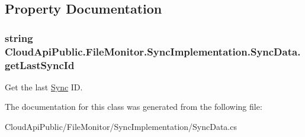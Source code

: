 \subsection{Property Documentation}
\hypertarget{class_cloud_api_public_1_1_file_monitor_1_1_sync_implementation_1_1_sync_data_a62814239485178d07f3560cd5d6c9724}{
\subsubsection[{get\-Last\-Sync\-Id}]{\setlength{\rightskip}{0pt plus 5cm}string Cloud\-Api\-Public.\-File\-Monitor.\-Sync\-Implementation.\-Sync\-Data.\-get\-Last\-Sync\-Id\hspace{0.3cm}{\ttfamily [get]}}}\label{class_cloud_api_public_1_1_file_monitor_1_1_sync_implementation_1_1_sync_data_a62814239485178d07f3560cd5d6c9724}


Get the last \hyperlink{namespace_cloud_api_public_1_1_sync}{Sync} I\-D. 



The documentation for this class was generated from the following file\-:\begin{DoxyCompactItemize}
\item 
Cloud\-Api\-Public/\-File\-Monitor/\-Sync\-Implementation/Sync\-Data.\-cs\end{DoxyCompactItemize}
